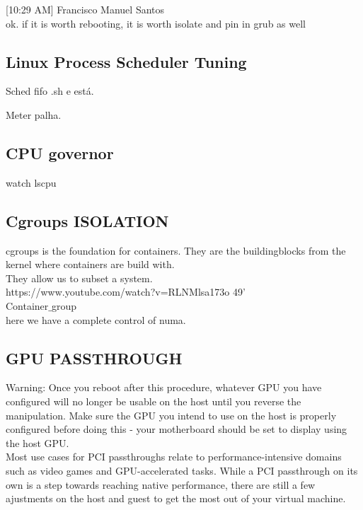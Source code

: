 \documentclass[11pt, a4paper, oneside]{article}
\theoremstyle{definition}
\begin{document}
[10:29 AM] Francisco Manuel Santos\\
ok. if it is worth rebooting, it is worth isolate and pin in grub as well\\



\subsection{Linux Process Scheduler Tuning}

Sched fifo .sh e está.

Meter palha.\\


\subsection{CPU governor}
watch lscpu\\

\vfill
\pagebreak
\subsection{Cgroups ISOLATION}
cgroups is the foundation for containers. They are the buildingblocks from the kernel where containers are build with.\\
They allow us to subset a system.\\
https://www.youtube.com/watch?v=RLNMlsa173o 49'\\
Container$\_$group\\
here we have a complete control of numa. 

\vfill
\pagebreak
\subsection{GPU PASSTHROUGH}

Warning: Once you reboot after this procedure, whatever GPU you have configured will no longer be usable on the host until you reverse the manipulation. Make sure the GPU you intend to use on the host is properly configured before doing this - your motherboard should be set to display using the host GPU.\\

Most use cases for PCI passthroughs relate to performance-intensive domains such as video games and GPU-accelerated tasks. While a PCI passthrough on its own is a step towards reaching native performance, there are still a few ajustments on the host and guest to get the most out of your virtual machine. \\
\end{document}

